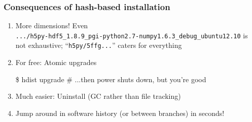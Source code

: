 \documentclass[sans,mathserif]{beamer}
\begin{document}
\begin{frame}[fragile]
  \frametitle{Consequences of hash-based installation}
  \begin{enumerate}
  \item<+-> More dimensions! Even \\
{\footnotesize
{\tt .../h5py-hdf5\_1.8.9\_pgi-python2.7-numpy1.6.3\_debug\_ubuntu12.10}
}
is not exhaustive; ``{\tt h5py/5ffg...}'' caters for everything

  \item<+-> For free: Atomic upgrades
\begin{semiverbatim}
\$ hdist upgrade
# ...then power shuts down, but you're good
\end{semiverbatim}

  \item<+-> Much easier: Uninstall (GC rather than file tracking)

  \item<+-> Jump around in software history (or between branches) in seconds!


  \end{enumerate}

~

\end{frame}
\end{document}

